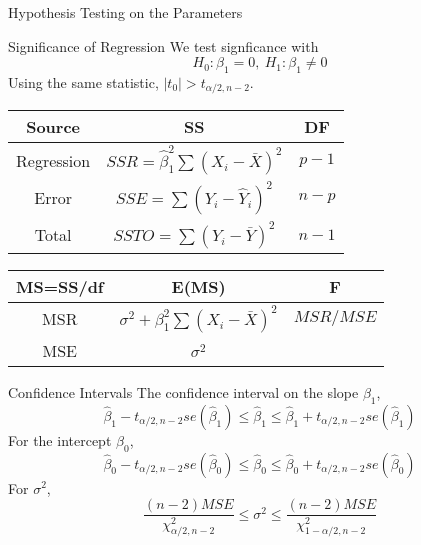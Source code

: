 \documentclass{article}
\begin{document}
\begin{multicols*}{3}
\begin{blackbox}{Hypothesis Testing on the Parameters}
    \end{blackbox}
    \begin{blackbox}{Significance of Regression}
        We test signficance with 
        \[H_0: \beta_1 = 0, \ H_1: \beta_1 \neq 0\]
        Using the same statistic, $|t_0| > t_{\alpha/2, n-2}$. 
        \renewcommand{\arraystretch}{1.5}
        \begin{center}
            \begin{tabular}{|c|c|c|}
                \hline
                Source & SS & DF \\
                \hline
                \hline
                Regression & $SSR = \hat{\beta}_1^2\sum(X_i-\bar{X})^2$ & $p-1$ \\
                \hline
                Error & $SSE=\sum(Y_i - \hat{Y}_i)^2$ & $n-p$\\
                \hline 
                Total & $SSTO =\sum(Y_i - \bar{Y})^2$ & $n-1$\\
                \hline
            \end{tabular}
        \end{center}
        \begin{center}
            \begin{tabular}{|c|c|c|}
                \hline
                MS=SS/df & E(MS) & F\\
                \hline
                \hline
                MSR & $\sigma^2 + \beta_1^2\sum(X_i - \bar{X})^2$ & $MSR/MSE$\\
                \hline
                MSE &  $\sigma^2$ &\\
                \hline 
            \end{tabular}
        \end{center}
    \end{blackbox}
    \begin{blackbox}{Confidence Intervals}
        The confidence interval on the slope $\beta_1$,\\[-1ex]
        \[\hat{\beta}_1 - t_{\alpha/2, n-2}se(\hat{\beta}_1) \leq \hat{\beta}_1 \leq \hat{\beta}_1 + t_{\alpha/2, n-2}se(\hat{\beta}_1)\]
        For the intercept $\beta_0$,\\[-1ex]
        \[\hat{\beta}_0 - t_{\alpha/2, n-2}se(\hat{\beta}_0) \leq \hat{\beta}_0 \leq \hat{\beta}_0 + t_{\alpha/2, n-2}se(\hat{\beta}_0)\]
        For $\sigma^2$, \\[-4ex]
        \[\frac{(n-2)MSE}{\chi^2_{\alpha/2, n-2}} \leq \sigma^2 \leq \frac{(n-2)MSE}{\chi^2_{1-\alpha/2, n-2}}\]

\end{blackbox}
\end{multicols*}
\end{document}
